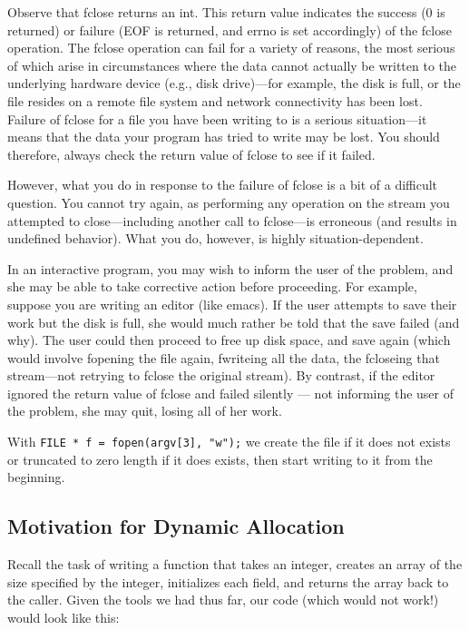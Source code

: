 \documentclass[11pt, a4paper]{article}
\begin{document}
Observe that fclose returns an int. This return value indicates the success (0 is returned) or failure (EOF is returned, and errno is set accordingly) of the fclose operation. The fclose operation can fail for a variety of reasons, the most serious of which arise in circumstances where the data cannot actually be written to the underlying hardware device (e.g., disk drive)—for example, the disk is full, or the file resides on a remote file system and network connectivity has been lost. Failure of fclose for a file you have been writing to is a serious situation—it means that the data your program has tried to write may be lost. You should therefore, always check the return value of fclose to see if it failed.

However, what you do in response to the failure of fclose is a bit of a difficult question. You cannot try again, as performing any operation on the stream you attempted to close—including another call to fclose—is erroneous (and results in undefined behavior). What you do, however, is highly situation-dependent.





In an interactive program, you may wish to inform the user of the problem, and she may be able to take corrective action before proceeding. For example, suppose you are writing an editor (like emacs). If the user attempts to save their work but the disk is full, she would much rather be told that the save failed (and why). The user could then proceed to free up disk space, and save again (which would involve fopening the file again, fwriteing all the data, the fcloseing that stream—not retrying to fclose the original stream). By contrast, if the editor ignored the return value of fclose and failed silently — not informing the user of the problem, she may quit, losing all of her work.




With \texttt{FILE * f = fopen(argv[3], "w");} we create the file if it does not exists or truncated to zero length if it does exists, then start writing to it from the beginning.



\subsection{Motivation for Dynamic Allocation}%
\label{sub:motivation_for_dynamic_allocation}


Recall the task of writing a function that takes an integer, creates an array of the size specified by the integer, initializes each field, and returns the array back to the caller. Given the tools we had thus far, our code (which would not work!) would look like this:
\end{document}
